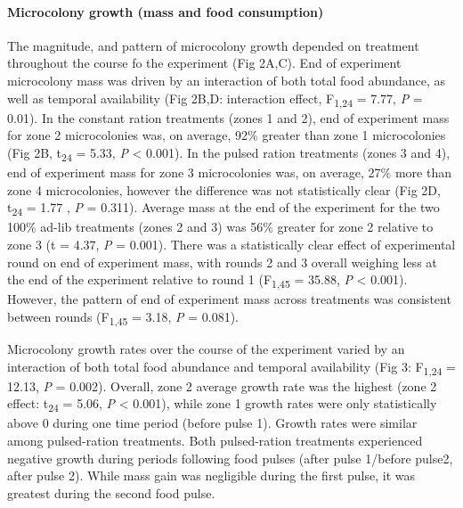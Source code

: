 \documentclass[11pt,]{article}
\let\oldparagraph\paragraph
\renewcommand{\paragraph}[1]{\oldparagraph{#1}\mbox{}}
\begin{document}
\hypertarget{microcolony-growth-mass-and-food-consumption}{%
\paragraph{Microcolony growth (mass and food
consumption)}\label{microcolony-growth-mass-and-food-consumption}}

The magnitude, and pattern of microcolony growth depended on treatment
throughout the course fo the experiment (Fig 2A,C). End of experiment
microcolony mass was driven by an interaction of both total food
abundance, as well as temporal availability (Fig 2B,D: interaction
effect, F\textsubscript{1,24} = 7.77, \emph{P} = 0.01). In the constant
ration treatments (zones 1 and 2), end of experiment mass for zone 2
microcolonies was, on average, 92\% greater than zone 1 microcolonies
(Fig 2B, t\textsubscript{24} = 5.33, \emph{P} \textless{} 0.001). In the
pulsed ration treatments (zones 3 and 4), end of experiment mass for
zone 3 microcolonies was, on average, 27\% more than zone 4
microcolonies, however the difference was not statistically clear (Fig
2D, t\textsubscript{24} = 1.77 , \emph{P} = 0.311). Average mass at the
end of the experiment for the two 100\% ad-lib treatments (zones 2 and
3) was 56\% greater for zone 2 relative to zone 3 (t = 4.37, \emph{P} =
0.001). There was a statistically clear effect of experimental round on
end of experiment mass, with rounds 2 and 3 overall weighing less at the
end of the experiment relative to round 1 (F\textsubscript{1,45} =
35.88, \emph{P} \textless{} 0.001). However, the pattern of end of
experiment mass across treatments was consistent between rounds
(F\textsubscript{1,45} = 3.18, \emph{P} = 0.081).

Microcolony growth rates over the course of the experiment varied by an
interaction of both total food abundance and temporal availability (Fig
3: F\textsubscript{1,24} = 12.13, \emph{P} = 0.002). Overall, zone 2
average growth rate was the highest (zone 2 effect: t\textsubscript{24}
= 5.06, \emph{P} \textless{} 0.001), while zone 1 growth rates were only
statistically above 0 during one time period (before pulse 1). Growth
rates were similar among pulsed-ration treatments. Both pulsed-ration
treatments experienced negative growth during periods following food
pulses (after pulse 1/before pulse2, after pulse 2). While mass gain was
negligible during the first pulse, it was greatest during the second
food pulse.
\end{document}
